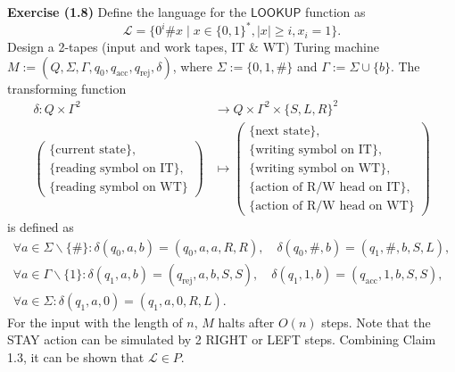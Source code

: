 \documentclass[a4paper]{article}
\begin{document}
\noindent\textbf{Exercise (1.8)}
    Define the language for the $\mathsf{LOOKUP}$ function as
    \[
        \mathcal L = \{0^i \# x \mid x\in \{0,1\}^*, |x| \geq i, x_i = 1\}.
    \]
    Design a 2-tapes (input and work tapes, IT \& WT) Turing machine 
    $M := (Q,\Sigma,\Gamma,q_0,q_\text{acc},q_\text{rej},\delta)$, 
    where $\Sigma := \{0,1,\#\}$ and $\Gamma := \Sigma \cup \{b\}$. 
    The transforming function
    \begin{align*}
        \delta : Q\times \Gamma^2 &\to Q\times \Gamma^2 \times \{S,L,R\}^2\\
        \left(\begin{array}{l}
            \{\text{current state}\},\\
            \{\text{reading symbol on IT}\},\\
            \{\text{reading symbol on WT}\}
        \end{array}\right) &\mapsto \left(\begin{array}{l}
            \{\text{next state}\},\\
            \{\text{writing symbol on IT}\},\\
            \{\text{writing symbol on WT}\},\\
            \{\text{action of R/W head on IT}\},\\
            \{\text{action of R/W head on WT}\}
        \end{array}\right)
    \end{align*}
    is defined as
    \[
        \begin{array}{l}
            \forall a \in \Sigma\backslash \{\#\}: \delta(q_0,a,b) = (q_0,a,a,R,R), \quad
            \delta(q_0,\#,b) = (q_1,\#,b,S,L),\\
            
            \forall a \in \Gamma\backslash\{1\}: \delta(q_1,a,b) = (q_\text{rej},a,b,S,S), \quad
            \delta(q_1,1,b) = (q_\text{acc},1,b,S,S),\\

            \forall a \in \Sigma: \delta(q_1,a,0) = (q_1,a,0,R,L).
        \end{array}
    \]
    For the input with the length of $n$, $M$ halts after $O(n)$ steps. Note that the STAY action can be simulated by 2 RIGHT or LEFT steps. Combining Claim 1.3, it can be shown that $\mathcal L \in P$.
\end{document}
